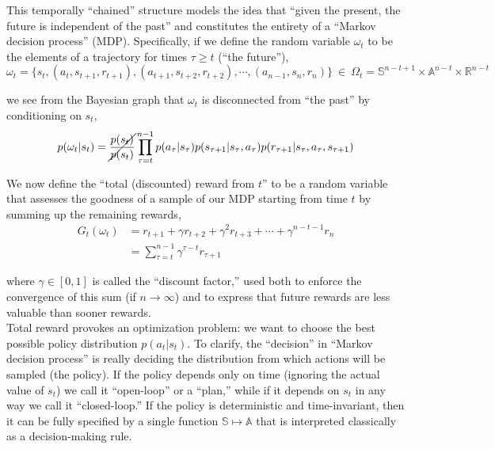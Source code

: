 This temporally ``chained'' structure models the idea that ``given the present, the future is independent of the past'' and constitutes the entirety of a ``Markov decision process'' (MDP). Specifically, if we define the random variable $\omega_t$ to be the elements of a trajectory for times $\tau \geq t$ (``the future''),
\begin{equation*}
\omega_t = \{s_t, (a_t, s_{t+1}, r_{t+1}), (a_{t+1}, s_{t+2}, r_{t+2}), \cdots, (a_{n-1}, s_{n}, r_n)\} \ \in \ \Omega_t = \mathbb{S}^{n-t+1} \times \mathbb{A}^{n-t} \times \mathbb{R}^{n-t}
\end{equation*}

we see from the Bayesian graph that $\omega_t$ is disconnected from ``the past'' by conditioning on $s_t$,
\begin{equation*}
p(\omega_t|s_t) = \cancel{\frac{p(s_t)}{p(s_t)}}\prod_{\tau=t}^{n-1} p(a_\tau|s_\tau)p(s_{\tau+1}|s_\tau,a_\tau)p(r_{\tau+1}|s_\tau,a_\tau,s_{\tau+1})
\end{equation*}

We now define the ``total (discounted) reward from $t$'' to be a random variable that assesses the goodness of a sample of our MDP starting from time $t$ by summing up the remaining rewards,
\begin{align*}
G_t(\omega_t) &= r_{t+1} + \gamma r_{t+2} + \gamma^2 r_{t+3} + \cdots + \gamma^{n-t-1} r_n\\
&= \sum_{\tau=t}^{n-1} \gamma^{\tau-t} r_{\tau+1}
\end{align*}

where $\gamma \in [0,1]$ is called the ``discount factor,'' used both to enforce the convergence of this sum (if $n \to \infty$) and to express that future rewards are less valuable than sooner rewards.\\

Total reward provokes an optimization problem: we want to choose the best possible policy distribution $p(a_t|s_t)$. To clarify, the ``decision'' in ``Markov decision process'' is really deciding the distribution from which actions will be sampled (the policy). If the policy depends only on time (ignoring the actual value of $s_t$) we call it ``open-loop'' or a ``plan,'' while if it depends on $s_t$ in any way we call it ``closed-loop.'' If the policy is deterministic and time-invariant, then it can be fully specified by a single function $\mathbb{S} \mapsto \mathbb{A}$ that is interpreted classically as a decision-making rule.\\

